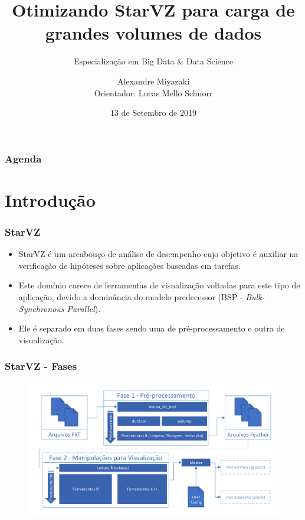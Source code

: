 \documentclass{beamer}
\title[]
      {Otimizando StarVZ para carga de grandes volumes de dados}
\subtitle{Especialização em Big Data \& Data Science}
\date{13 de Setembro de 2019}
\author{Alexandre Miyazaki  \\ Orientador: Lucas Mello Schnorr}
\institute{Instituto de Informática --- UFRGS\\}
\begin{document}
\InfTitlePage

\begin{frame}
  \frametitle{Agenda}
  \tableofcontents
\end{frame}

\section{Introdução}
\begin{frame}
\frametitle{StarVZ}
  \begin{itemize}
   \item StarVZ é um arcabouço de análise de desempenho cujo objetivo é auxiliar 
na verificação de hipóteses sobre aplicações baseadas em tarefas.
   \item Este domínio carece de ferramentas de visualização voltadas para este 
tipo de aplicação, devido a dominância do modelo predecessor (BSP - 
\textit{Bulk-Synchronous Parallel}).
  \item Ele é separado em duas fases sendo uma de pré-processamento e outra de 
visualização.
  \end{itemize}
\end{frame}

\begin{frame}
 \frametitle{StarVZ - Fases}
 \begin{figure}[H]
  \centerline{\includegraphics[width=1\textwidth]{./img/all-proc.pdf}}
  \label{fig:hadoop}
  \end{figure}
\end{frame}
\end{document}
